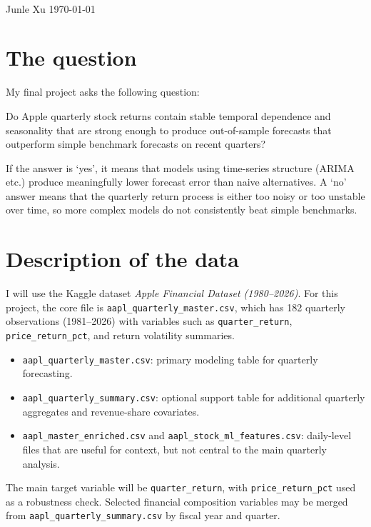 \documentclass[11pt]{article}
\begin{document}
\\
\noindent Junle Xu \hfill \today
\vspace{0.5em}

\section*{The question}
My final project asks the following question: 

Do Apple quarterly stock returns contain stable temporal dependence and seasonality that are strong enough to produce out-of-sample forecasts that outperform simple benchmark forecasts on recent quarters?

If the answer is `yes', it means that models using time-series structure (ARIMA etc.) produce meaningfully lower forecast error than naive alternatives. A `no' answer means that the quarterly return process is either too noisy or too unstable over time, so more complex models do not consistently beat simple benchmarks.

\section*{Description of the data}
I will use the Kaggle dataset \textit{Apple Financial Dataset (1980--2026)}. For this project, the core file is \texttt{aapl\_quarterly\_master.csv}, which has 182 quarterly observations (1981--2026) with variables such as \texttt{quarter\_return}, \texttt{price\_return\_pct}, and return volatility summaries.

\begin{itemize}
	\item \texttt{aapl\_quarterly\_master.csv}: primary modeling table for quarterly forecasting.
	\item \texttt{aapl\_quarterly\_summary.csv}: optional support table for additional quarterly aggregates and revenue-share covariates.
	\item \texttt{aapl\_master\_enriched.csv} and \texttt{aapl\_stock\_ml\_features.csv}: daily-level files that are useful for context, but not central to the main quarterly analysis.
\end{itemize}

The main target variable will be \texttt{quarter\_return}, with \texttt{price\_return\_pct} used as a robustness check. Selected financial composition variables may be merged from \texttt{aapl\_quarterly\_summary.csv} by fiscal year and quarter.
\end{document}
